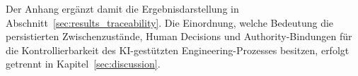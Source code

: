 Der Anhang ergänzt damit die Ergebnisdarstellung in
Abschnitt~\ref{sec:results_traceability}. Die Einordnung, welche Bedeutung die
persistierten Zwischenzustände, Human Decisions und Authority-Bindungen für die
Kontrollierbarkeit des KI-gestützten Engineering-Prozesses besitzen, erfolgt
getrennt in Kapitel~\ref{sec:discussion}.
